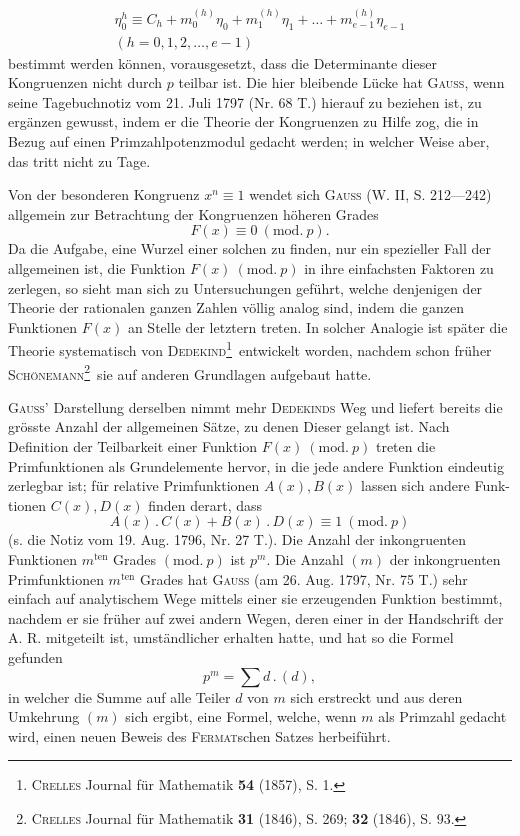 \[
\begin{gathered}
\eta_0^h\equiv C_h+m_0^{(h)}\eta_0+m_1^{(h)}\eta_1+\ldots+m_{e-1}^{(h)}\eta_{e-1}\\
(h=0,1,2,\ldots,e-1)
\end{gathered}
\]
bestimmt werden können, vorausgesetzt, dass die Determinante dieser Kongruenzen nicht durch \(p\) teilbar ist. Die hier bleibende Lücke hat \textsc{Gauss}, wenn seine Tagebuchnotiz vom 21. Juli 1797 (Nr. 68 T.) hierauf zu beziehen ist, zu ergänzen gewusst, indem er die Theorie der Kongruenzen zu Hilfe zog, die in Bezug auf einen Primzahlpotenzmodul gedacht werden; in welcher Weise aber, das tritt nicht zu Tage.

Von der besonderen Kongruenz \(x^n\equiv1\) wendet sich \textsc{Gauss} (W. II, S. 212—242) allgemein zur Betrachtung der Kongruenzen höheren Grades
\[
F(x)\equiv0\ (\mathrm{mod.}\ p).
\]
Da die Aufgabe, eine Wurzel einer solchen zu finden, nur ein spezieller Fall der allgemeinen ist, die Funktion \(F(x)\ (\mathrm{mod.}\ p)\) in ihre einfachsten Faktoren zu zerlegen, so sieht man sich zu Untersuchungen geführt, welche denjenigen der Theorie der rationalen ganzen Zahlen völlig analog sind, indem die ganzen Funktionen \(F(x)\) an Stelle der letztern treten. In solcher Analogie ist später die Theorie systematisch von \textsc{Dedekind}\footnote{\textsc{Crelles} Journal für Mathematik \textbf{54} (1857), S. 1.}\ entwickelt worden, nachdem schon früher \textsc{Schönemann}\begingroup\renewcommand{\thefootnote}{**)}\footnote{\textsc{Crelles} Journal für Mathematik \textbf{31} (1846), S. 269; \textbf{32} (1846), S. 93.}\endgroup\ sie auf anderen Grundlagen aufgebaut hatte.

\textsc{Gauss}’ Darstellung derselben nimmt mehr \textsc{Dedekinds} Weg und liefert bereits die grösste Anzahl der allgemeinen Sätze, zu denen Dieser gelangt ist. Nach Definition der Teilbarkeit einer Funktion \(F(x)\ (\mathrm{mod.}\ p)\) treten die Primfunktionen als Grundelemente hervor, in die jede andere Funktion eindeutig zerlegbar ist; für relative Primfunktionen \(A(x),B(x)\) lassen sich andere Funk-
\newpage{}
\noindent tionen \(C(x),D(x)\) finden derart, dass
\[
A(x)\mathbin{.}C(x)+B(x)\mathbin{.}D(x)\equiv1\ (\mathrm{mod.}\ p)
\]
(s. die Notiz vom 19. Aug. 1796, Nr. 27 T.). Die Anzahl der inkongruenten Funktionen \(m^{\mathrm{ten}}\) Grades \((\mathrm{mod.}\ p)\) ist \(p^m\). Die Anzahl \((m)\) der inkongruenten Primfunktionen \(m^{\mathrm{ten}}\) Grades hat \textsc{Gauss} (am 26. Aug. 1797, Nr. 75 T.) sehr einfach auf analytischem Wege mittels einer sie erzeugenden Funktion bestimmt, nachdem er sie früher auf zwei andern Wegen, deren einer in der Handschrift der A. R. mitgeteilt ist, umständlicher erhalten hatte, und hat so die Formel gefunden
\[
p^m=\textstyle\sum d\mathbin{.}(d),
\]
in welcher die Summe auf alle Teiler \(d\) von \(m\) sich erstreckt und aus deren Umkehrung \((m)\) sich ergibt, eine Formel, welche, wenn \(m\) als Primzahl gedacht wird, einen neuen Beweis des \textsc{Fermat}schen Satzes herbeiführt.
